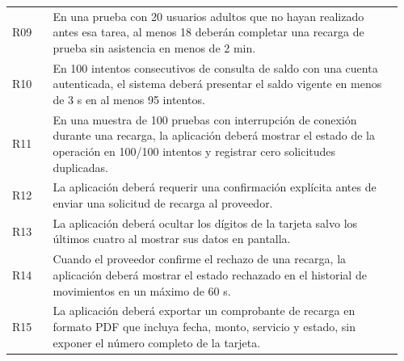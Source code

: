 \documentclass[10pt,letterpaper]{article}
\begin{document}
\begin{longtable}{@{}p{0.10\linewidth}p{0.86\linewidth}@{}}
R09 & En una prueba con 20 usuarios adultos que no hayan realizado antes esa tarea, al menos 18 deberán completar una recarga de prueba sin asistencia en menos de 2 min.\\
R10 & En 100 intentos consecutivos de consulta de saldo con una cuenta autenticada, el sistema deberá presentar el saldo vigente en menos de 3 s en al menos 95 intentos.\\
R11 & En una muestra de 100 pruebas con interrupción de conexión durante una recarga, la aplicación deberá mostrar el estado de la operación en 100/100 intentos y registrar cero solicitudes duplicadas.\\
R12 & La aplicación deberá requerir una confirmación explícita antes de enviar una solicitud de recarga al proveedor.\\
R13 & La aplicación deberá ocultar los dígitos de la tarjeta salvo los últimos cuatro al mostrar sus datos en pantalla.\\
R14 & Cuando el proveedor confirme el rechazo de una recarga, la aplicación deberá mostrar el estado rechazado en el historial de movimientos en un máximo de 60 s.\\
R15 & La aplicación deberá exportar un comprobante de recarga en formato PDF que incluya fecha, monto, servicio y estado, sin exponer el número completo de la tarjeta.\\
\bottomrule
\end{longtable}
\normalsize
\end{document}
